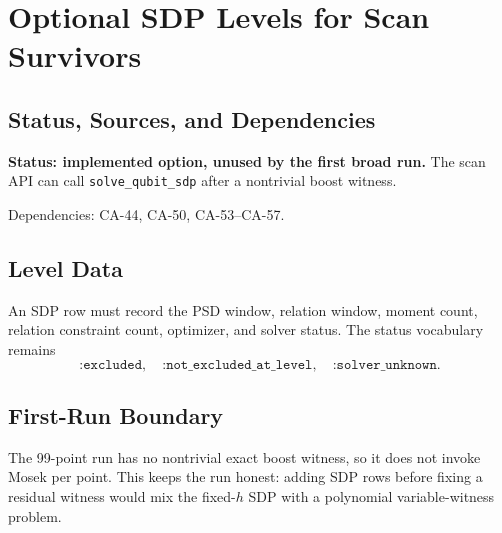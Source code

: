 
\section{Optional SDP Levels for Scan Survivors}
\label{sec:qubit-sdp-scan-levels}

\subsection{Status, Sources, and Dependencies}

\textbf{Status: implemented option, unused by the first broad run.}  The scan
API can call \texttt{solve\_qubit\_sdp} after a nontrivial boost witness.

Dependencies: CA-44, CA-50, CA-53--CA-57.


\subsection{Level Data}

An SDP row must record the PSD window, relation window, moment count, relation
constraint count, optimizer, and solver status.  The status vocabulary remains
\[
  \texttt{:excluded},\quad
  \texttt{:not\_excluded\_at\_level},\quad
  \texttt{:solver\_unknown}.
\]

\subsection{First-Run Boundary}

The 99-point run has no nontrivial exact boost witness, so it does not invoke
Mosek per point.  This keeps the run honest: adding SDP rows before fixing a
residual witness would mix the fixed-\(h\) SDP with a polynomial
variable-witness problem.
